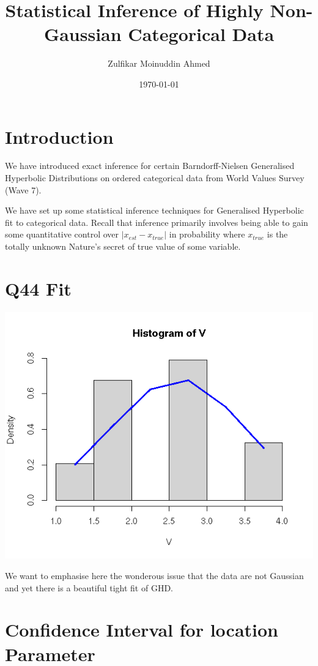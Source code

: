 \documentclass{amsart}
\title{Statistical Inference of Highly Non-Gaussian Categorical Data}
\author{Zulfikar Moinuddin Ahmed}
\date{\today}
\begin{document}
\maketitle

\section{Introduction}

We have introduced exact inference for certain Barndorff-Nielsen Generalised Hyperbolic Distributions on ordered categorical data from World Values Survey (Wave 7).  

We have set up some statistical inference techniques for Generalised Hyperbolic fit to categorical data.  Recall that inference primarily involves being able to gain some quantitative control over $|x_{est} - x_{true}|$ in probability where $x_{true}$ is the totally unknown Nature's secret of true value of some variable.

\section{Q44 Fit}

\includegraphics[scale=0.7]{ghdQ44.png}

We want to emphasise here the wonderous issue that the data are not Gaussian and yet there is a beautiful tight fit of GHD.  

\section{Confidence Interval for location Parameter}
\end{document}
